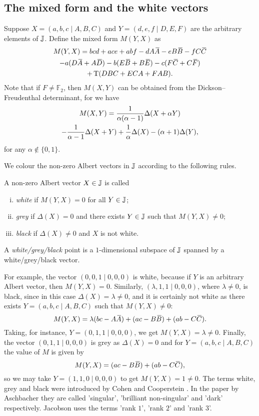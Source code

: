 \subsection{The mixed form and the white vectors}
Suppose $X = (a,b,c \mid A,B,C)$ and $Y = (d,e,f\mid D,E,F)$ are the arbitrary elements
of $\mathbb{J}$. Define the mixed form
$M(Y,X)$ as
\begin{multline}
	M(Y,X) = bcd + ace + abf - d A\ovA  -e B \ovB - f C\ovC \\
	- a(D\ovA + A\ovD) - b(E\ovB + B\ovE) - c(F\ovC + C\ovF) \\
	+ \Tr(DBC + ECA + FAB). 
\end{multline}
Note that if $F \neq \mathbb{F}_2$, then $M(X,Y)$ can be obtained from the 
Dickson--Freudenthal
determinant, for we have
\begin{multline}
	M(X,Y) = \frac{1}{\alpha (\alpha - 1)} \Delta(X + \alpha Y) \\
	- \frac{1}{\alpha - 1} \Delta(X+Y) + \frac{1}{\alpha} \Delta(X) - (\alpha+1)\Delta(Y),
\end{multline}
for any $\alpha \not\in \{0,1\}$.

We colour the non-zero Albert vectors in $\mathbb{J}$ according to the following rules. 
\begin{definition}
	A non-zero Albert vector $X \in \mathbb{J}$ is called
	\begin{enumerate}[(i)]
		\item \textit{white} if $M(Y,X) = 0$ for all $Y \in \mathbb{J}$;
		\item \textit{grey} if $\Delta(X) = 0$ and there exists $Y \in \mathbb{J}$ such that 
			$M(Y,X) \neq 0$;
		\item \textit{black} if $\Delta(X) \neq 0$ and $X$ is not white.  
	\end{enumerate}
	A \textit{white/grey/black} point is a $1$-dimensional subspace of $\mathbb{J}$ spanned by a 
	white/grey/black vector. 
\end{definition}

For example, the vector $(0,0,1\mid 0,0,0)$ is white, because if $Y$
is an arbitrary Albert vector, then $M(Y,X) = 0$. Similarly, $(\lambda,1,1\mid 0,0,0)$,
where $\lambda \neq 0$, is black, since in this case $\Delta(X) = \lambda \neq 0$,
and it is certainly not white as there exists $Y = (a,b,c\mid A,B,C)$ such that 
$M(Y,X)\neq 0$:
\begin{equation}
	M(Y,X) = \lambda (bc - A\ovA) + (ac - B\ovB) + (ab - C\ovC). 
\end{equation}
Taking, for instance, $Y = (0,1,1\mid 0,0,0)$, we get $M(Y,X) = \lambda \neq 0$. Finally, the
vector
\mbox{$(0,1,1\mid 0,0,0)$} is grey as $\Delta(X) = 0$ and for $Y = (a,b,c\mid A,B,C)$ the
value of $M$ is given by
\begin{equation}
	M(Y,X) = (ac - B\ovB) + (ab - C\ovC),
\end{equation}
so we may take $Y = (1,1,0\mid 0,0,0)$ to get $M(Y,X) = 1 \neq 0$. 
The terms white, grey and black were introduced by Cohen and Cooperstein 
\cite{CC}. In the paper by Aschbacher \cite{Asch1} they are called
'singular', 'brilliant non-singular' and 'dark' respectively. 
Jacobson \cite{JacobsonTwo} uses the terms 'rank $1$', 'rank $2$' and 'rank $3$'. 

